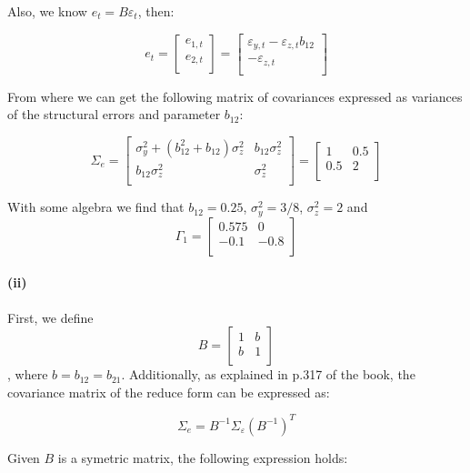 \documentclass[]{article}
\let\oldparagraph\paragraph
\renewcommand{\paragraph}[1]{\oldparagraph{#1}\mbox{}}
\begin{document}
Also, we know \(e_t=B\varepsilon_t\), then:

\[e_t=
    \left[ {\begin{array}{cc}
   e_{1,t}  \\
   e_{2,t} \\
  \end{array} } \right]=
  \left[ {\begin{array}{cc}
   \varepsilon_{y,t}-\varepsilon_{z,t}b_{12} \\
   -\varepsilon_{z,t} \\
  \end{array} } \right]
  \]

From where we can get the following matrix of covariances expressed as
variances of the structural errors and parameter \(b_{12}\):

\[ \Sigma_e=
    \left[ {\begin{array}{cc}
   \sigma_y^2+(b_{12}^2+b_{12})\sigma_z^2 & b_{12}\sigma_z^2 \\
   b_{12}\sigma_z^2 & \sigma_z^2 \\
  \end{array} } \right]=
  \left[ {\begin{array}{cc}
   1 & 0.5 \\
   0.5 & 2 \\
  \end{array} } \right]
\]

With some algebra we find that \(b_{12}=0.25\), \(\sigma_y^2=3/8\),
\(\sigma_z^2=2\) and \[\Gamma_1=
  \left[ {\begin{array}{cc}
  0.575 & 0 \\
  -0.1 & -0.8 \\
  \end{array} } \right]\]

\paragraph{(ii)}\label{ii}

First, we define \[B=
\left[ {\begin{array}{cc}
1 & b \\
b & 1 \\
\end{array} } \right]\], where \(b=b_{12}=b_{21}\). Additionally, as
explained in p.317 of the book, the covariance matrix of the reduce form
can be expressed as:

\[\Sigma_e=B^{-1}\Sigma_\varepsilon (B^{-1})^T\]

Given \(B\) is a symetric matrix, the following expression holds:
\end{document}
